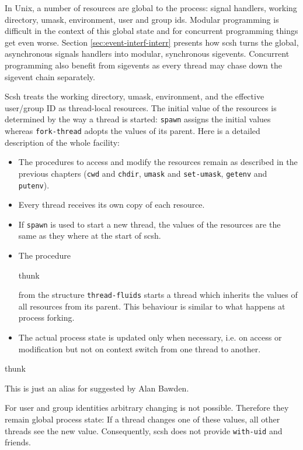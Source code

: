 In Unix, a number of resources are global to the process: signal
handlers, working directory, umask, environment, user and group ids.
Modular programming is difficult in the context of this global state
and for concurrent programming things get even worse. Section
\ref{sec:event-interf-interr} presents how scsh turns
the global, asynchronous signals handlers into modular, synchronous
sigevents. Concurrent programming also benefit from sigevents as every
thread may chase down the sigevent chain separately.

Scsh treats the working directory, umask, environment, and the
effective user/group ID as thread-local resources. The initial value
of the resources is determined by the way a thread is started:
\texttt{spawn} assigns the initial values whereas \texttt{fork-thread}
adopts the values of its parent. Here is a detailed description of the
whole facility:

\begin{itemize}
\item The procedures to access and modify the resources remain as
  described in the previous chapters (\texttt{cwd} and \texttt{chdir},
  \texttt{umask} and \texttt{set-umask}, \texttt{getenv} and
  \texttt{putenv}).
\item Every thread receives its own copy of each resource.
\item If \texttt{spawn} is used to start a new thread, the values of
  the resources are the same as they where at the start of scsh.
\item The procedure 

 {thunk} \undefined 

from the structure \texttt{thread-fluids} starts a thread which
inherits the values of all resources from its parent. This behaviour
is similar to what happens at process forking.
\item The actual process state is updated only when necessary, i.e. on
  access or modification but not on context switch from one thread
  to another.
\end{itemize}

 {thunk} \undefined

This is just an alias for  suggested by Alan Bawden.

For user and group identities arbitrary changing is not possible.
Therefore they remain global process state: If a thread changes one of
these values, all other threads see the new value. Consequently, scsh
does not provide \texttt{with-uid} and friends.

